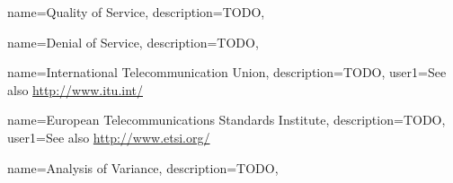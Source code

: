 {
  name=Quality of Service,
  description={TODO},
}

{
  name=Denial of Service,
  description={TODO},
}

{
  name=International Telecommunication Union,
  description={TODO},
  user1={See also \url{http://www.itu.int/}}
}

{
  name=European Telecommunications Standards Institute,
  description={TODO},
  user1={See also \url{http://www.etsi.org/}}
}

{
  name=Analysis of Variance,
  description={TODO},
}

